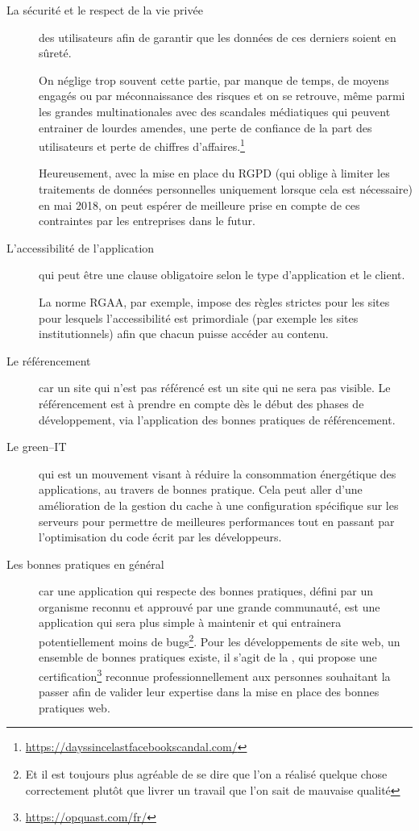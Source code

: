\begin{description}
	\item [La sécurité et le respect de la vie privée] des utilisateurs afin de garantir que les données de ces derniers soient en sûreté. 
	
	On néglige trop souvent cette partie, par manque de temps, de moyens engagés ou par méconnaissance des risques et on se retrouve, même parmi les grandes multinationales avec des scandales médiatiques qui peuvent entrainer de lourdes amendes, une perte de confiance de la part des utilisateurs et perte de chiffres d'affaires.\footnote{\url{https://dayssincelastfacebookscandal.com/}}
	
	Heureusement, avec la mise en place du \gls{RGPD} (qui oblige à limiter les traitements de données personnelles uniquement lorsque cela est nécessaire) en mai 2018, on peut espérer de meilleure prise en compte de ces contraintes par les entreprises dans le futur.
	\item [L'accessibilité de l'application] qui peut être une clause obligatoire selon le type d'application et le client.
	
	La norme \gls{RGAA}, par exemple, impose des règles strictes pour les sites pour lesquels l'accessibilité est primordiale (par exemple les sites institutionnels) afin que chacun puisse accéder au contenu.
	\item [Le référencement] car un site qui n'est pas référencé est un site qui ne sera pas visible. Le référencement est à prendre en compte dès le début des phases de développement, via l'application des bonnes pratiques de référencement.
	\item [Le green--IT] qui est un mouvement visant à réduire la consommation énergétique des applications, au travers de bonnes pratique. Cela peut aller d'une amélioration de la gestion du cache à une configuration spécifique sur les serveurs pour permettre de meilleures performances tout en passant par l'optimisation du code écrit par les développeurs.
	\item [Les bonnes pratiques en général] car une application qui respecte des bonnes pratiques, défini par un organisme reconnu et approuvé par une grande communauté, est une application qui sera plus simple à maintenir et qui entrainera potentiellement moins de bugs\footnote{Et il est toujours plus agréable de se dire que l'on a réalisé quelque chose correctement plutôt que livrer un travail que l'on sait de mauvaise qualité}. Pour les développements de site web, un ensemble de bonnes pratiques existe, il s'agit de la  \cite{opquast-best-practices}, qui propose une certification\footnote{\url{https://opquast.com/fr/}} reconnue professionnellement aux personnes souhaitant la passer afin de valider leur expertise dans la mise en place des bonnes pratiques web.
\end{description}

